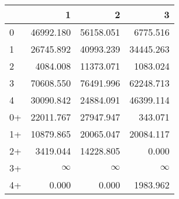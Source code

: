 \begin{tabular}{lrrr}
\toprule
     &         1 &         2 &         3 \\
\midrule
 0   & \num{46992.180} & \num{56158.051} &  \num{6775.516} \\
 1   & \num{26745.892} & \num{40993.239} & \num{34445.263} \\
 2   &  \num{4084.008} & \num{11373.071} &  \num{1083.024} \\
 3   & \num{70608.550} & \num{76491.996} & \num{62248.713} \\
 4   & \num{30090.842} & \num{24884.091} & \num{46399.114} \\
 0+  & \num{22011.767} & \num{27947.947} &   \num{343.071} \\
 1+  & \num{10879.865} & \num{20065.047} & \num{20084.117} \\
 2+  &  \num{3419.044} & \num{14228.805} &     \num{0.000} \\
 3+  &  $\infty$    &  $\infty$    &  $\infty$    \\
 4+  &     \num{0.000} &     \num{0.000} &  \num{1983.962} \\
\bottomrule
\end{tabular}